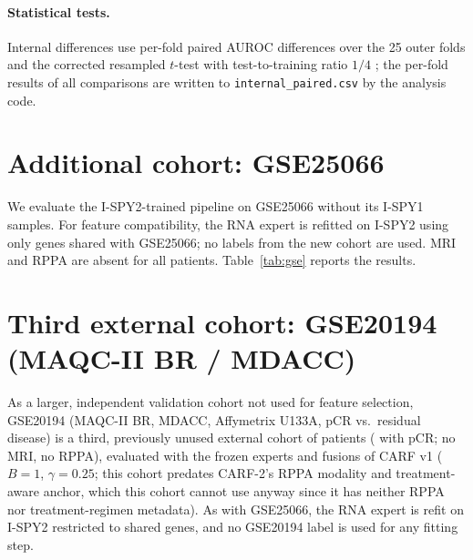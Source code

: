 \documentclass[a4paper,runningheads]{llncs}
\begin{document}
\begin{table}[h]
\centering
\caption{External AUROC under input-level corruption of the frozen experts (mean of 30 realizations): fraction of genes removed, fraction of genes shifted by two log-ratio units, Gaussian noise on the MRI features in training SDs, and fraction of MRI features removed.}
\label{tab:inputfull}
\setlength{\tabcolsep}{3pt}
\end{table}

\paragraph{Statistical tests.} Internal differences use per-fold paired AUROC differences over the 25 outer folds and the corrected resampled $t$-test with test-to-training ratio $1/4$ \cite{nadeau2003}; the per-fold results of all comparisons are written to \texttt{internal\_paired.csv} by the analysis code.

\section{Additional cohort: GSE25066}

We evaluate the I-SPY2-trained pipeline on GSE25066 without its I-SPY1 samples. For feature compatibility, the RNA expert is refitted on I-SPY2 using only genes shared with GSE25066; no labels from the new cohort are used. MRI and RPPA are absent for all patients. Table~\ref{tab:gse} reports the results.

\begin{table}[h]
\centering
\caption{GSE25066 without its I-SPY1 samples (\GseN{} patients, \GsePos{} with pCR; RNA refitted on I-SPY2 restricted to the shared genes; MRI and RPPA absent). Swap and dropout: mean of 30 realizations.}
\label{tab:gse}
\small
{}
\end{table}

\section{Third external cohort: GSE20194 (MAQC-II BR / MDACC)}

As a larger, independent validation cohort not used for feature selection, GSE20194 (MAQC-II BR, MDACC, Affymetrix U133A, pCR vs.\ residual disease) is a third, previously unused external cohort of \GseTwoZeroOneNineFourN{} patients (\GseTwoZeroOneNineFourPos{} with pCR; no MRI, no RPPA), evaluated with the frozen experts and fusions of CARF v1 ($B=1$, $\gamma=0.25$; this cohort predates CARF-2's RPPA modality and treatment-aware anchor, which this cohort cannot use anyway since it has neither RPPA nor treatment-regimen metadata). As with GSE25066, the RNA expert is refit on I-SPY2 restricted to shared genes, and no GSE20194 label is used for any fitting step.
\end{document}
